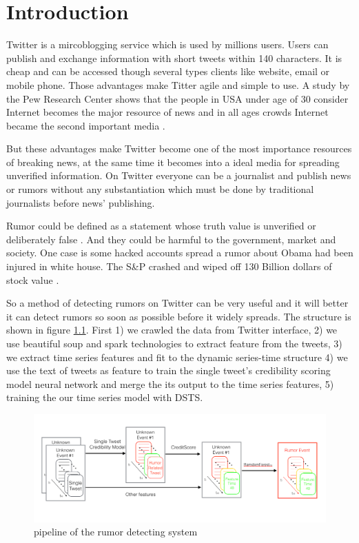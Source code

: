 \chapter{Introduction} %
\label{cha:introduction}
Twitter is a mircoblogging service which is used by millions users. Users can publish and exchange information with short tweets within 140 characters. It is cheap and can be accessed though several types clients like website, email or mobile phone. Those advantages make Titter agile and simple to use.  A study by the Pew Research Center shows that the people in USA under age of 30 consider Internet becomes the major resource of news and in all ages crowds Internet became the second important media \cite{kohut2008internet}.

But these advantages make Twitter become one of the most importance resources of breaking news, at the same time it becomes into a ideal media for spreading unverified information. On Twitter everyone can be a journalist and publish news or rumors without any substantiation which must be done by traditional journalists before news' publishing. 

 Rumor could be defined as a statement whose truth value is unverified or deliberately false \cite{qazvinian2011rumor}. And they could be harmful to the government, market and society. One case is some hacked accounts spread a rumor about Obama had been injured in white house. The S\&P crashed and wiped off 130 Billion dollars of stock value \cite{matthews2013does}. 
 
 So a method of detecting rumors on Twitter can be very useful and it will better it can detect rumors so soon as possible before it widely spreads.    
 The structure is shown in figure \ref{fig:pipeline}. First 1) we crawled the data from Twitter interface, 2) we use beautiful soup and spark technologies to extract feature from the tweets, 3) we extract time series features and fit to the dynamic series-time structure 4) we use the text of tweets as feature to train the single tweet's credibility scoring model neural network and merge the its output to the time series features, 5) training the our time series model with DSTS.  
 
 \begin{figure}[!h]
\centering
\includegraphics[width=\columnwidth]{images/structuremodel.png}
\caption{ pipeline of the rumor detecting system }
\label{fig:pipeline}
\end{figure}

